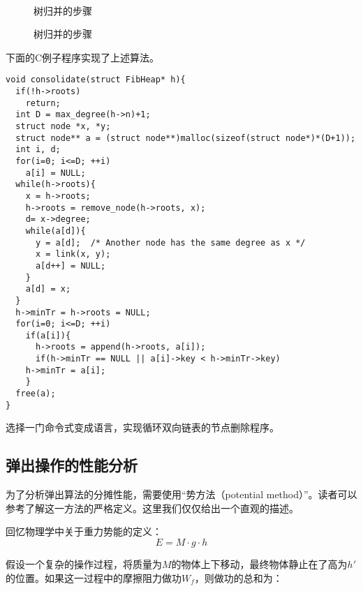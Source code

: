 \documentclass[UTF8]{article}
\begin{document}
\begin{figure}[htbp]
  \centering
   \\
  \caption{树归并的步骤} \label{fig:fib-cons-b}
\end{figure}

\begin{figure}[htbp]
  \centering
  \caption{树归并的步骤} \label{fig:fib-cons-c}
\end{figure}

下面的C例子程序实现了上述算法。

\lstset{language = C}
\begin{lstlisting}
void consolidate(struct FibHeap* h){
  if(!h->roots)
    return;
  int D = max_degree(h->n)+1;
  struct node *x, *y;
  struct node** a = (struct node**)malloc(sizeof(struct node*)*(D+1));
  int i, d;
  for(i=0; i<=D; ++i)
    a[i] = NULL;
  while(h->roots){
    x = h->roots;
    h->roots = remove_node(h->roots, x);
    d= x->degree;
    while(a[d]){
      y = a[d];  /* Another node has the same degree as x */
      x = link(x, y);
      a[d++] = NULL;
    }
    a[d] = x;
  }
  h->minTr = h->roots = NULL;
  for(i=0; i<=D; ++i)
    if(a[i]){
      h->roots = append(h->roots, a[i]);
      if(h->minTr == NULL || a[i]->key < h->minTr->key)
	h->minTr = a[i];
    }
  free(a);
}
\end{lstlisting}

\begin{Exercise}
选择一门命令式变成语言，实现循环双向链表的节点删除程序。
\end{Exercise}

\subsection{弹出操作的性能分析}

为了分析弹出算法的分摊性能，需要使用“势方法（potential method）”。读者可以参考\cite{CLRS}了解这一方法的严格定义。这里我们仅仅给出一个直观的描述。

回忆物理学中关于重力势能的定义：
\[
E = M \cdot g \cdot h
\]

假设一个复杂的操作过程，将质量为$M$的物体上下移动，最终物体静止在了高为$h'$的位置。如果这一过程中的摩擦阻力做功$W_f$，则做功的总和为：
\end{document}

